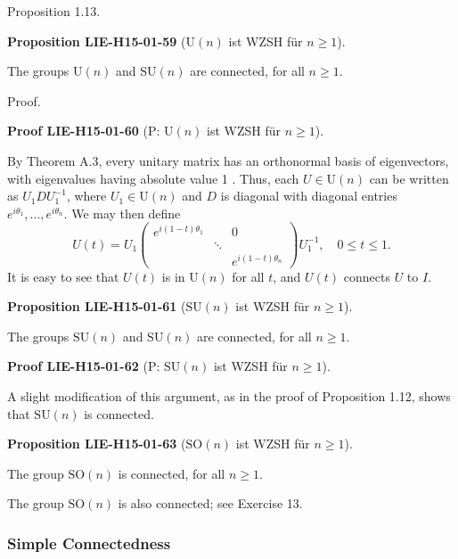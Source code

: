 \documentclass[10pt, letterpaper]{article}
\newcommand{\SO}{\mathrm{SO}}
\newcommand{\SU}{\mathrm{SU}}
\newcommand{\U}{\mathrm{U}}
\newcommand{\CustomHeading}[3]{%
  \par\medskip\noindent%
  \textbf{#1 #2} \textnormal{(#3)}.\enskip%
}
\newenvironment{PROP}[2]{\begin{unitbox}\CustomHeading{Proposition}{#1}{#2}}{\end{unitbox}}
\newenvironment{PROOF}[2]{\begin{unitbox}\CustomHeading{Proof}{#1}{#2}}{\end{unitbox}}
\begin{document}
Proposition 1.13. 


\begin{PROP}{LIE-H15-01-59}{$\U(n)$ ist WZSH für $n\geq 1$}
The groups $\mathrm{U}(n)$ and $\mathrm{SU}(n)$ are connected, for all $n \geq 1$.
\end{PROP}


Proof. 


\begin{PROOF}{LIE-H15-01-60}{P: $\U(n)$ ist WZSH für $n\geq 1$}
By Theorem A.3, every unitary matrix has an orthonormal basis of eigenvectors, with eigenvalues having absolute value 1 . Thus, each $U \in \mathrm{U}(n)$ can be written as $U_{1} D U_{1}^{-1}$, where $U_{1} \in \mathrm{U}(n)$ and $D$ is diagonal with diagonal entries $e^{i \theta_{1}}, \ldots, e^{i \theta_{n}}$. We may then define
$$
U(t)=U_{1}\left(\begin{array}{ccc}
e^{i(1-t) \theta_{1}} & & 0 \\
& \ddots & \\
& & e^{i(1-t) \theta_{n}}
\end{array}\right) U_{1}^{-1}, \quad 0 \leq t \leq 1 .
$$
It is easy to see that $U(t)$ is in $\mathrm{U}(n)$ for all $t$, and $U(t)$ connects $U$ to $I$.
\end{PROOF}


\begin{PROP}{LIE-H15-01-61}{$\SU(n)$ ist WZSH für $n\geq 1$}
The groups $\mathrm{SU}(n)$ and $\mathrm{SU}(n)$ are connected, for all $n \geq 1$.
\end{PROP}

\begin{PROOF}{LIE-H15-01-62}{P: $\SU(n)$ ist WZSH für $n\geq 1$}
A slight modification of this argument, as in the proof of Proposition 1.12, shows that $\mathrm{SU}(n)$ is connected.
\end{PROOF}


\begin{PROP}{LIE-H15-01-63}{$\SO(n)$ ist WZSH für $n\geq 1$}
The group $\mathrm{SO}(n)$ is connected, for all $n \geq 1$.
\end{PROP}


The group $\mathrm{SO}(n)$ is also connected; see Exercise 13.





\subsubsection*{Simple Connectedness}
\end{document}
